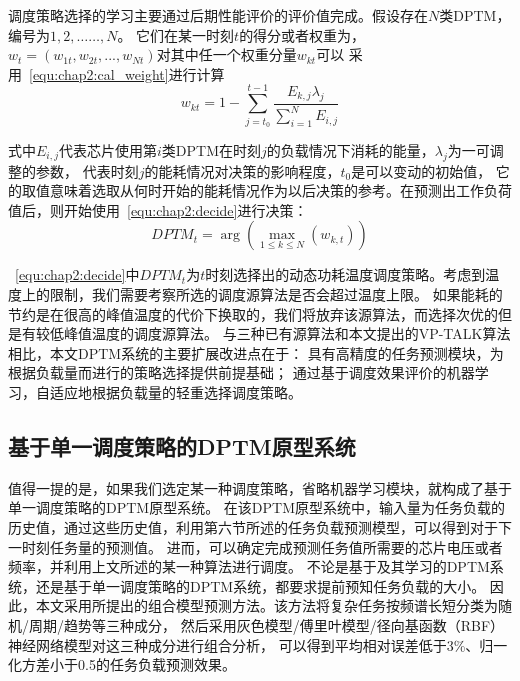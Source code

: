 调度策略选择的学习主要通过后期性能评价的评价值完成。假设存在$N$类DPTM，编号为$1,2,……,N$。 它们在某一时刻$t$的得分或者权重为，$w_t=(w_{1t},w_{2t},...,w_{Nt})$对其中任一个权重分量$w_{kt}$可以 采用~\ref{equ:chap2:cal_weight}进行计算
\begin{equation}
\label{equ:chap2:cal_weight}
w_{kt} = 1- \sum\limits_{j=t_0}^{t-1} \frac{E_{k,j}\lambda_j}{\sum\limits_{i=1}^N E_{i,j}}
\end{equation}

式中$E_{i,j}$代表芯片使用第$i$类DPTM在时刻$j$的负载情况下消耗的能量，$\lambda_{j}$为一可调整的参数， 代表时刻$j$的能耗情况对决策的影响程度，$t_0$是可以变动的初始值， 它的取值意味着选取从何时开始的能耗情况作为以后决策的参考。在预测出工作负荷值后，则开始使用~\ref{equ:chap2:decide}进行决策：
\begin{equation}
\label{equ:chap2:decide}
DPTM_t = \arg(\max\limits_{1\le k \le N}(w_{k,t}))
\end{equation}

~\ref{equ:chap2:decide}中$DPTM_t$为$t$时刻选择出的动态功耗温度调度策略。考虑到温度上的限制，我们需要考察所选的调度源算法是否会超过温度上限。 如果能耗的节约是在很高的峰值温度的代价下换取的，我们将放弃该源算法，而选择次优的但是有较低峰值温度的调度源算法。
与三种已有源算法和本文提出的VP-TALK算法相比，本文DPTM系统的主要扩展改进点在于： 具有高精度的任务预测模块，为根据负载量而进行的策略选择提供前提基础； 通过基于调度效果评价的机器学习，自适应地根据负载量的轻重选择调度策略。

\subsection{基于单一调度策略的DPTM原型系统}

值得一提的是，如果我们选定某一种调度策略，省略机器学习模块，就构成了基于单一调度策略的DPTM原型系统。 在该DPTM原型系统中，输入量为任务负载的历史值，通过这些历史值，利用第六节所述的任务负载预测模型，可以得到对于下一时刻任务量的预测值。 进而，可以确定完成预测任务值所需要的芯片电压或者频率，并利用上文所述的某一种算法进行调度。
不论是基于及其学习的DPTM系统，还是基于单一调度策略的DPTM系统，都要求提前预知任务负载的大小。 因此，本文采用所提出的组合模型预测方法。该方法将复杂任务按频谱长短分类为随机/周期/趋势等三种成分， 然后采用灰色模型/傅里叶模型/径向基函数（RBF）神经网络模型对这三种成分进行组合分析， 可以得到平均相对误差低于3\%、归一化方差小于0.5的任务负载预测效果。